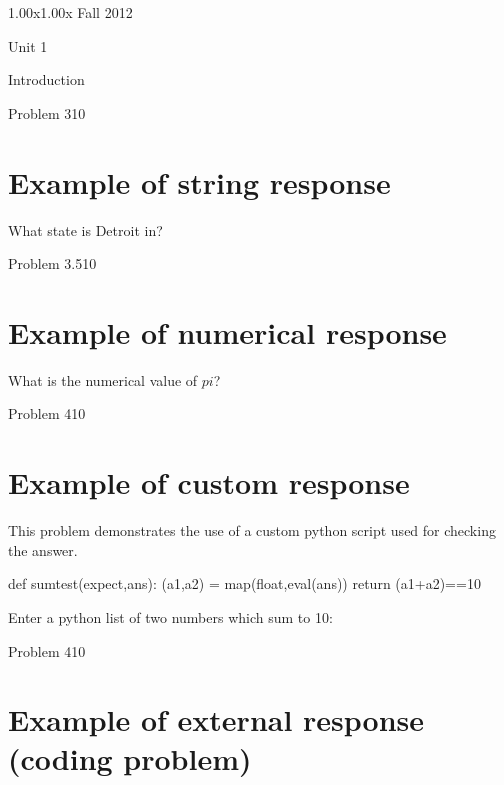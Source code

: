 \documentclass[12pt]{article}
\begin{document}
\begin{edXcourse}{1.00x}{1.00x Fall 2012}
\begin{edXchapter}{Unit 1}
\begin{edXsection}{Introduction}
\begin{edXproblem}{Problem 3}{10}
\section{Example of string response}  

What state is Detroit in?


\end{edXproblem}


\begin{edXproblem}{Problem 3.5}{10}

\section{Example of numerical response}  

What is the numerical value of $pi$?


\end{edXproblem}


\begin{edXproblem}{Problem 4}{10}

\section{Example of custom response}  

This problem demonstrates the use of a custom python script used for
checking the answer.

\begin{edXscript}
def sumtest(expect,ans):
    (a1,a2) = map(float,eval(ans))
    return (a1+a2)==10
\end{edXscript}

Enter a python list of two numbers which sum to 10:


\end{edXproblem}


\begin{edXproblem}{Problem 4}{10}

\section{Example of external response (coding problem)}  


\end{edXproblem}
\end{edXsection}
\end{edXchapter}
\end{edXcourse}
\end{document}
